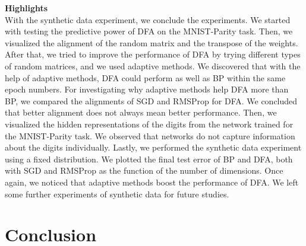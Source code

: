 \documentclass[a4paper, nobind]{templates/ociamthesis}
\begin{document}
\noindent \textbf{Highlights}\\
With the synthetic data experiment, we conclude the experiments. We started with testing the predictive power of DFA on the MNIST-Parity task. Then, we visualized the alignment of the random matrix and the transpose of the weights. After that, we tried to improve the performance of DFA by trying different types of random matrices, and we used adaptive methods. We discovered that with the help of adaptive methods, DFA could perform as well as BP within the same epoch numbers. For investigating why adaptive methods help DFA more than BP, we compared the alignments of SGD and RMSProp for DFA. We concluded that better alignment does not always mean better performance. Then, we visualized the hidden representations of the digits from the network trained for the MNIST-Parity task. We observed that networks do not capture information about the digits individually. Lastly, we performed the synthetic data experiment using a fixed distribution. We plotted the final test error of BP and DFA, both with SGD and RMSProp as the function of the number of dimensions. Once again, we noticed that adaptive methods boost the performance of DFA. We left some further experiments of synthetic data for future studies.

\hypertarget{conc}{%
\chapter*{Conclusion}\label{conc}}
\end{document}
